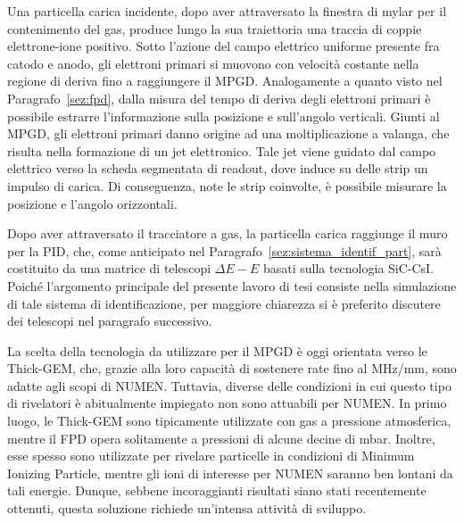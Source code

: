 Una particella carica incidente, dopo aver attraversato la finestra di mylar per il contenimento del gas, produce lungo la sua traiettoria una traccia di coppie elettrone-ione positivo. 
Sotto l'azione del campo elettrico uniforme presente fra catodo e anodo, gli elettroni primari si muovono con velocità costante nella regione di deriva fino a raggiungere il MPGD.
Analogamente a quanto visto nel Paragrafo~\ref{sez:fpd}, dalla misura del tempo di deriva degli elettroni primari è possibile estrarre l'informazione sulla posizione e sull'angolo verticali.
Giunti al MPGD, gli elettroni primari danno origine ad una moltiplicazione a valanga, che risulta nella formazione di un jet elettronico. 
Tale jet viene guidato dal campo elettrico verso la scheda segmentata di readout, dove induce su delle strip un impulso di carica. 
Di conseguenza, note le strip coinvolte, è possibile misurare la posizione e l'angolo orizzontali. 





Dopo aver attraversato il tracciatore a gas, la particella carica raggiunge il muro per la PID, che, come anticipato nel Paragrafo~\ref{sez:sistema_identif_part}, sarà costituito da una matrice di telescopi $\Delta E - E$ basati sulla tecnologia SiC-CsI.
Poiché l'argomento principale del presente lavoro di tesi consiste nella simulazione di tale sistema di identificazione, per maggiore chiarezza si è preferito discutere dei telescopi nel paragrafo successivo.

La scelta della tecnologia da utilizzare per il MPGD è oggi orientata verso le Thick-GEM, che, grazie alla loro capacità di sostenere rate fino al MHz/mm, sono adatte agli scopi di NUMEN.
Tuttavia, diverse delle condizioni in cui questo tipo di rivelatori è abitualmente impiegato non sono attuabili per NUMEN. 
In primo luogo, le Thick-GEM sono tipicamente utilizzate con gas a pressione atmosferica, mentre il FPD opera solitamente a pressioni di alcune decine di mbar.
Inoltre, esse spesso sono utilizzate per rivelare particelle in condizioni di Minimum Ionizing Particle, mentre gli ioni di interesse per NUMEN saranno ben lontani da tali energie.
Dunque, sebbene incoraggianti risultati siano stati recentemente ottenuti, questa soluzione richiede un'intensa attività di sviluppo.


